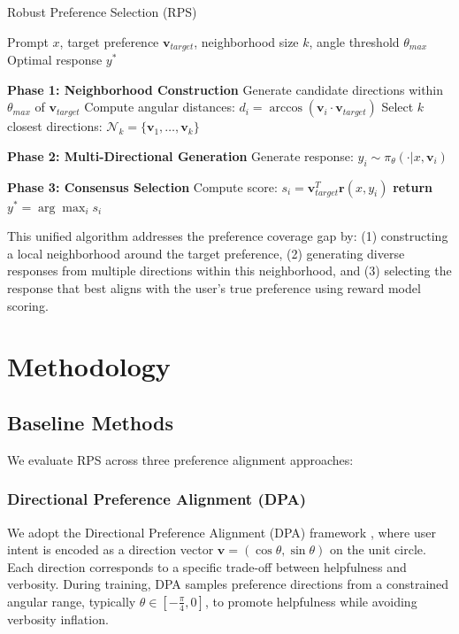 \documentclass{article} %
\begin{document}
\begin{algorithm}[H]
\caption{Robust Preference Selection (RPS)}
\begin{algorithmic}[1]
\REQUIRE Prompt $x$, target preference $\mathbf{v}_{target}$, neighborhood size $k$, angle threshold $\theta_{max}$
\ENSURE Optimal response $y^*$

\STATE \textbf{Phase 1: Neighborhood Construction}
\STATE Generate candidate directions within $\theta_{max}$ of $\mathbf{v}_{target}$
\STATE Compute angular distances: $d_i = \arccos(\mathbf{v}_i \cdot \mathbf{v}_{target})$
\STATE Select $k$ closest directions: $\mathcal{N}_k = \{\mathbf{v}_1, \ldots, \mathbf{v}_k\}$

\STATE \textbf{Phase 2: Multi-Directional Generation}
    \STATE Generate response: $y_i \sim \pi_\theta(\cdot|x, \mathbf{v}_i)$
\ENDFOR

\STATE \textbf{Phase 3: Consensus Selection}
    \STATE Compute score: $s_i = \mathbf{v}_{target}^T \mathbf{r}(x, y_i)$
\ENDFOR
\STATE \textbf{return} $y^* = \arg\max_i s_i$
\end{algorithmic}
\end{algorithm}

This unified algorithm addresses the preference coverage gap by: (1) constructing a local neighborhood around the target preference, (2) generating diverse responses from multiple directions within this neighborhood, and (3) selecting the response that best aligns with the user's true preference using reward model scoring.

\section{Methodology}

\subsection{Baseline Methods}

We evaluate RPS across three preference alignment approaches:

\subsubsection{Directional Preference Alignment (DPA)}
We adopt the Directional Preference Alignment (DPA) framework \cite{rafailov2024direct}, where user intent is encoded as a direction vector $\mathbf{v} = (\cos \theta, \sin \theta)$ on the unit circle. Each direction corresponds to a specific trade-off between helpfulness and verbosity. During training, DPA samples preference directions from a constrained angular range, typically $\theta \in [-\frac{\pi}{4}, 0]$, to promote helpfulness while avoiding verbosity inflation.
\end{document}

